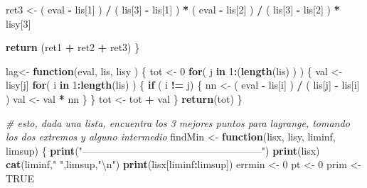 \documentclass[]{article}
\newenvironment{Shaded}{\begin{snugshade}}{\end{snugshade}}
\newcommand{\KeywordTok}[1]{\textcolor[rgb]{0.13,0.29,0.53}{\textbf{#1}}}
\newcommand{\DecValTok}[1]{\textcolor[rgb]{0.00,0.00,0.81}{#1}}
\newcommand{\CharTok}[1]{\textcolor[rgb]{0.31,0.60,0.02}{#1}}
\newcommand{\StringTok}[1]{\textcolor[rgb]{0.31,0.60,0.02}{#1}}
\newcommand{\CommentTok}[1]{\textcolor[rgb]{0.56,0.35,0.01}{\textit{#1}}}
\newcommand{\OtherTok}[1]{\textcolor[rgb]{0.56,0.35,0.01}{#1}}
\newcommand{\ControlFlowTok}[1]{\textcolor[rgb]{0.13,0.29,0.53}{\textbf{#1}}}
\newcommand{\OperatorTok}[1]{\textcolor[rgb]{0.81,0.36,0.00}{\textbf{#1}}}
\newcommand{\NormalTok}[1]{#1}
\begin{document}
\begin{Shaded}
\begin{Highlighting}[]
\NormalTok{  ret3 <-}\StringTok{ }\NormalTok{( eval }\OperatorTok{-}\StringTok{ }\NormalTok{lis[}\DecValTok{1}\NormalTok{] ) }\OperatorTok{/}\StringTok{ }\NormalTok{( lis[}\DecValTok{3}\NormalTok{] }\OperatorTok{-}\StringTok{ }\NormalTok{lis[}\DecValTok{1}\NormalTok{] ) }\OperatorTok{*}\StringTok{ }\NormalTok{( eval }\OperatorTok{-}\StringTok{ }\NormalTok{lis[}\DecValTok{2}\NormalTok{] ) }\OperatorTok{/}\StringTok{ }\NormalTok{( lis[}\DecValTok{3}\NormalTok{] }\OperatorTok{-}\StringTok{ }\NormalTok{lis[}\DecValTok{2}\NormalTok{] ) }\OperatorTok{*}\StringTok{ }\NormalTok{lisy[}\DecValTok{3}\NormalTok{]}
  
  \KeywordTok{return}\NormalTok{ (ret1 }\OperatorTok{+}\StringTok{ }\NormalTok{ret2 }\OperatorTok{+}\StringTok{ }\NormalTok{ret3)}
\NormalTok{\}}

\NormalTok{lag<-}\StringTok{ }\ControlFlowTok{function}\NormalTok{(eval, lis, lisy )}
\NormalTok{\{ }
\NormalTok{  tot <-}\StringTok{ }\DecValTok{0}
  \ControlFlowTok{for}\NormalTok{( j }\ControlFlowTok{in} \DecValTok{1}\OperatorTok{:}\NormalTok{(}\KeywordTok{length}\NormalTok{(lis) ) )}
\NormalTok{  \{}
\NormalTok{    val <-}\StringTok{ }\NormalTok{lisy[j]}
    \ControlFlowTok{for}\NormalTok{( i }\ControlFlowTok{in} \DecValTok{1}\OperatorTok{:}\KeywordTok{length}\NormalTok{(lis)  )}
\NormalTok{    \{}
      \ControlFlowTok{if}\NormalTok{ ( i }\OperatorTok{!=}\StringTok{ }\NormalTok{j)}
\NormalTok{      \{}
\NormalTok{        nn <-}\StringTok{ }\NormalTok{( eval }\OperatorTok{-}\StringTok{ }\NormalTok{lis[i] ) }\OperatorTok{/}\StringTok{ }\NormalTok{( lis[j] }\OperatorTok{-}\StringTok{ }\NormalTok{lis[i] )}
\NormalTok{        val <-}\StringTok{ }\NormalTok{val }\OperatorTok{*}\StringTok{ }\NormalTok{nn}
\NormalTok{      \}}
\NormalTok{    \}}
\NormalTok{    tot <-}\StringTok{ }\NormalTok{tot }\OperatorTok{+}\StringTok{ }\NormalTok{val}
\NormalTok{  \}}
  \KeywordTok{return}\NormalTok{(tot)}
\NormalTok{\}}

\CommentTok{# esto, dada una lista, encuentra los 3 mejores puntos para lagrange, tomando los dos extremos y alguno intermedio}
\NormalTok{findMin <-}\StringTok{ }\ControlFlowTok{function}\NormalTok{(lisx, lisy, liminf, limsup)}
\NormalTok{\{}
  \KeywordTok{print}\NormalTok{(}\StringTok{"------------------------------------------------------"}\NormalTok{)}
  \KeywordTok{print}\NormalTok{(lisx)}
  \KeywordTok{cat}\NormalTok{(liminf,}\StringTok{"  "}\NormalTok{,limsup,}\StringTok{"}\CharTok{\textbackslash{}n}\StringTok{"}\NormalTok{)}
  \KeywordTok{print}\NormalTok{(lisx[liminf}\OperatorTok{:}\NormalTok{limsup])}
\NormalTok{  errmin <-}\StringTok{ }\DecValTok{0}
\NormalTok{  pt <-}\StringTok{ }\DecValTok{0}
\NormalTok{  prim <-}\StringTok{ }\OtherTok{TRUE}
  

\end{Highlighting}
\end{Shaded}
\end{document}
